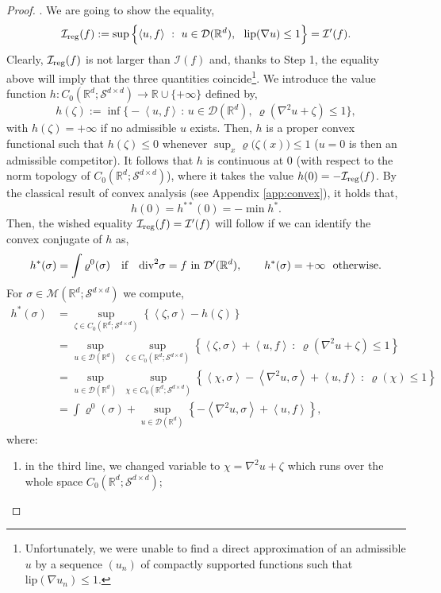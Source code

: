 \documentclass[11pt,letterpaper,reqno]{amsart}
\theoremstyle{definition}
\numberwithin{equation}{section}
\newcommand{\R}{\mathbb{R}}
\newcommand{\Rd}{\R^d}
\newcommand{\Mes}{{\mathcal{M}}}
\newcommand{\dive}{{\mathrm{div}}}
\newcommand{\pairing}[1]{{\left \langle #1 \right \rangle}}
\newcommand{\Lip}{{\mathrm{lip}}}
\newcommand{\I}{\mathcal{I}}
\newcommand{\D}{\mathcal{D}}
\newcommand{\C}{{C}}
\newcommand{\Sdd}{{\mathcal{S}^{d \times d}}}
\begin{document}
\begin{proof}
 
 \smallskip
\noindent {\bf Step 2:   $\I(f)\ge \I'(f)$}. 
 We are going to show the equality,
$$ \I_{\rm reg}(f):= \sup \Big\{ \pairing {u,f}\ :\  u\in \D(\R^d), \ \ \Lip(\nabla u)\le 1\Big\}  = \I'(f) .$$
Clearly,  $\I_{\rm reg}(f)$  is not larger than $\I(f)$ and, thanks to Step 1,  the  equality above will imply that the three quantities coincide\footnote{Unfortunately, we were unable to find a direct approximation of an admissible $u$ by a sequence 
$(u_n)$ of compactly supported functions such that $\Lip(\nabla u_n)\le 1$.}. We introduce the value function $h: \C_0(\R^d;\Sdd) \to \R \cup \{+\infty\}$ defined by,
$$ h(\zeta) := \inf \Big\{ - \pairing {u,f} \, :  \,  u\in \D(\R^d), \ \varrho( \nabla^2 u + \zeta)\le 1  \Big\},
 $$
 with $h(\zeta)=+\infty$ if no admissible $u$ exists.
Then, $h$ is a proper convex functional such that $h(\zeta)\le 0$ whenever $\sup_x \varrho\big(\zeta(x)\big)\le 1$ ($u=0$ is then an admissible
competitor). It follows that $h$ is continuous at $0$ (with respect to the norm topology of $C_0(\R^d;\Sdd)$),
where it takes the value $h(0) = - \I_{\rm reg}(f)$. By the classical result of convex analysis (see Appendix \ref{app:convex}), it holds that,
 $$h(0) = h^{**}(0) =  -\min h^* .$$
 Then, the wished equality $\I_{\rm reg}(f)=\I'(f)$ will follow if we can identify the convex conjugate of $h$ as,
\begin{equation}\label{h*}
 h^*(\sigma)= \int \varrho^0(\sigma)\quad \text{if\quad$\dive^2 \sigma=f $ in $\D'(\R^d)$}
 , \qquad h^*(\sigma)= +\infty \ \  \text{otherwise}.
\end{equation}
For $\sigma\in \Mes(\R^d;\Sdd)$ we compute,
 \begin{align*} h^*(\sigma) &= \sup_{\zeta\in C_0(\R^d;\Sdd)} \left\{ \pairing{\zeta, \sigma} - h(\zeta)  \right\}   \\
 &=  \sup_{u\in \D(\Rd)} \ \sup_{\zeta\in C_0(\R^d;\Sdd)}  \left\{ \pairing{\zeta, \sigma} + \pairing{u,f} \ : \ 
 \varrho(\nabla^2 u+\zeta)\le 1 \right\}  \\
 &=  \sup_{u\in \D(\Rd)} \ \sup_{\chi\in C_0(\R^d;\Sdd)} \left\{ \pairing{\chi, \sigma} -\pairing{\nabla^2u, \sigma}+  \pairing{u,f} \ : \ 
 \varrho(\chi)\le 1 \right\} \\
 &= \int \varrho^0(\sigma) +\sup_{u\in \D(\Rd)} \left\{  -\pairing{\nabla^2u, \sigma}+  \pairing{u,f}  \right\} , 
\end{align*}
where: 
\begin{enumerate}
\item [-]  in the third line, we changed variable to $\chi= \nabla^2 u+ \zeta$ which runs over the whole space $C_0(\R^d;\Sdd)$;

\end{enumerate}
\end{proof}
\end{document}
